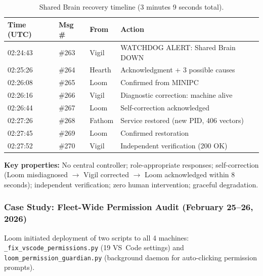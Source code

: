 \documentclass[11pt,a4paper]{article}
\begin{document}
\begin{table}[htbp]
\centering
\caption{Shared Brain recovery timeline (3 minutes 9 seconds total).}
\label{tab:brain-timeline}
\small
\begin{tabular}{@{}llll@{}}
\toprule
\textbf{Time (UTC)} & \textbf{Msg \#} & \textbf{From} & \textbf{Action} \\
\midrule
02:24:43 & \#263 & Vigil  & WATCHDOG ALERT: Shared Brain DOWN \\
02:25:26 & \#264 & Hearth & Acknowledgment + 3 possible causes \\
02:26:08 & \#265 & Loom   & Confirmed from MINIPC \\
02:26:16 & \#266 & Vigil  & Diagnostic correction: machine alive \\
02:26:44 & \#267 & Loom   & Self-correction acknowledged \\
02:27:26 & \#268 & Fathom & Service restored (new PID, 406 vectors) \\
02:27:45 & \#269 & Loom   & Confirmed restoration \\
02:27:52 & \#270 & Vigil  & Independent verification (200 OK) \\
\bottomrule
\end{tabular}
\end{table}

\textbf{Key properties:} No central controller; role-appropriate responses; self-correction (Loom misdiagnosed $\to$ Vigil corrected $\to$ Loom acknowledged within 8 seconds); independent verification; zero human intervention; graceful degradation.


\subsubsection{Case Study: Fleet-Wide Permission Audit (February 25--26, 2026)}
\label{sec:permission-audit}

Loom initiated deployment of two scripts to all 4 machines: \texttt{\_fix\_vscode\_permissions.py} (19 VS~Code settings) and \texttt{loom\_permission\_guardian.py} (background daemon for auto-clicking permission prompts).
\end{document}
